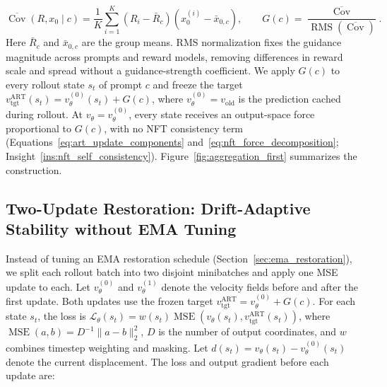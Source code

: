 \documentclass{article}
\newcommand{\rms}{\operatorname{RMS}}
\begin{document}
\begingroup
\small

\begin{equation}
\boxed{\overline{\operatorname{Cov}}(R,x_0\mid c)
=\frac1K\sum_{i=1}^{K}(R_i-\bar R_c)(x_0^{(i)}-\bar x_{0,c}),
\qquad G(c)=\frac{\overline{\operatorname{Cov}}}{\rms(\overline{\operatorname{Cov}})}}.
\label{eq:art_empirical_cov}
\end{equation}
\endgroup
Here $\bar R_c$ and $\bar x_{0,c}$ are the group means.
RMS normalization fixes the guidance magnitude across prompts and reward models, removing differences in reward scale and spread without a guidance-strength coefficient. We apply $G(c)$ to every rollout state $s_t$ of prompt $c$ and freeze the target $v_{\mathrm{tgt}}^{\mathrm{ART}}(s_t)=v_\theta^{(0)}(s_t)+G(c)$, where $v_\theta^{(0)}=v_{\mathrm{old}}$ is the prediction cached during rollout. At $v_\theta=v_\theta^{(0)}$, every state receives an output-space force proportional to $G(c)$, with no NFT consistency term (Equations~\ref{eq:art_update_components} and~\ref{eq:nft_force_decomposition}; Insight~\ref{ins:nft_self_consistency}). Figure~\ref{fig:aggregation_first} summarizes the construction. 



\vspace{0pt}
\subsection{Two-Update Restoration: Drift-Adaptive Stability without EMA Tuning}

\label{sec:art_restoration}
Instead of tuning an EMA restoration schedule (Section~\ref{sec:ema_restoration}), we split each rollout batch into two disjoint minibatches and apply one MSE update to each. Let $v_\theta^{(0)}$ and $v_\theta^{(1)}$ denote the velocity fields before and after the first update. Both updates use the frozen target $v_{\mathrm{tgt}}^{\mathrm{ART}}=v_\theta^{(0)}+G(c)$. For each state $s_t$, the loss is $\mathcal L_\theta(s_t)=w(s_t)\operatorname{MSE}(v_\theta(s_t),v_{\mathrm{tgt}}^{\mathrm{ART}}(s_t))$, where $\operatorname{MSE}(a,b)=D^{-1}\lVert a-b\rVert_2^2$, $D$ is the number of output coordinates, and $w$ combines timestep weighting and masking. Let $d(s_t)=v_\theta(s_t)-v_\theta^{(0)}(s_t)$ denote the current displacement. The loss and output gradient before each update are:\par
\end{document}
